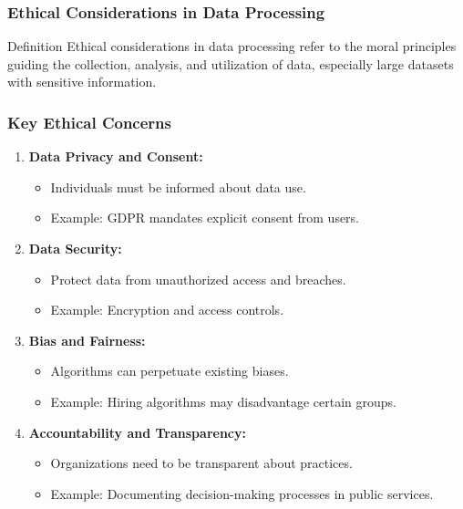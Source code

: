 \documentclass[aspectratio=169]{beamer}
\begin{document}
\begin{frame}[fragile]
    \frametitle{Ethical Considerations in Data Processing}

    \begin{block}{Definition}
        Ethical considerations in data processing refer to the moral principles guiding the collection, analysis, and utilization of data, especially large datasets with sensitive information.
    \end{block}
\end{frame}

\begin{frame}[fragile]
    \frametitle{Key Ethical Concerns}
    
    \begin{enumerate}
        \item \textbf{Data Privacy and Consent:}
        \begin{itemize}
            \item Individuals must be informed about data use.
            \item Example: GDPR mandates explicit consent from users.
        \end{itemize}
        
        \item \textbf{Data Security:}
        \begin{itemize}
            \item Protect data from unauthorized access and breaches.
            \item Example: Encryption and access controls.
        \end{itemize}

        \item \textbf{Bias and Fairness:}
        \begin{itemize}
            \item Algorithms can perpetuate existing biases.
            \item Example: Hiring algorithms may disadvantage certain groups.
        \end{itemize}

        \item \textbf{Accountability and Transparency:}
        \begin{itemize}
            \item Organizations need to be transparent about practices.
            \item Example: Documenting decision-making processes in public services.
        \end{itemize}
    \end{enumerate}
\end{frame}
\end{document}
